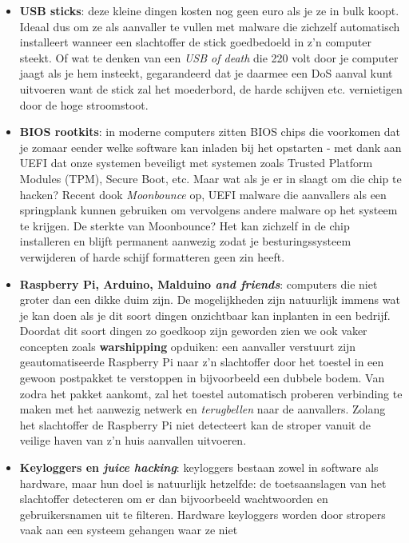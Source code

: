 \documentclass[
  10pt,
  dutch,
  paper=a4,
  ,captions=tableheading
]{scrbook}
\providecommand{\tightlist}{%
  \setlength{\itemsep}{0pt}\setlength{\parskip}{0pt}}
\begin{document}
\begin{itemize}
\tightlist
\item
  \textbf{USB sticks}: deze kleine dingen kosten nog geen euro als je ze
  in bulk koopt. Ideaal dus om ze als aanvaller te vullen met malware
  die zichzelf automatisch installeert wanneer een slachtoffer de stick
  goedbedoeld in z'n computer steekt. Of wat te denken van een \emph{USB
  of death} die 220 volt door je computer jaagt als je hem insteekt,
  gegarandeerd dat je daarmee een DoS aanval kunt uitvoeren want de
  stick zal het moederbord, de harde schijven etc. vernietigen door de
  hoge stroomstoot.
\item
  \textbf{BIOS rootkits}: in moderne computers zitten BIOS chips die
  voorkomen dat je zomaar eender welke software kan inladen bij het
  opstarten - met dank aan UEFI dat onze systemen beveiligt met systemen
  zoals Trusted Platform Modules (TPM), Secure Boot, etc. Maar wat als
  je er in slaagt om die chip te hacken? Recent dook \emph{Moonbounce}
  op, UEFI malware die aanvallers als een springplank kunnen gebruiken
  om vervolgens andere malware op het systeem te krijgen. De sterkte van
  Moonbounce? Het kan zichzelf in de chip installeren en blijft
  permanent aanwezig zodat je besturingssysteem verwijderen of harde
  schijf formatteren geen zin heeft.
\item
  \textbf{Raspberry Pi, Arduino, Malduino \emph{and friends}}: computers
  die niet groter dan een dikke duim zijn. De mogelijkheden zijn
  natuurlijk immens wat je kan doen als je dit soort dingen onzichtbaar
  kan inplanten in een bedrijf. Doordat dit soort dingen zo goedkoop
  zijn geworden zien we ook vaker concepten zoals \textbf{warshipping}
  opduiken: een aanvaller verstuurt zijn geautomatiseerde Raspberry Pi
  naar z'n slachtoffer door het toestel in een gewoon postpakket te
  verstoppen in bijvoorbeeld een dubbele bodem. Van zodra het pakket
  aankomt, zal het toestel automatisch proberen verbinding te maken met
  het aanwezig netwerk en \emph{terugbellen} naar de aanvallers. Zolang
  het slachtoffer de Raspberry Pi niet detecteert kan de stroper vanuit
  de veilige haven van z'n huis aanvallen uitvoeren.
\item
  \textbf{Keyloggers en \emph{juice hacking}}: keyloggers bestaan zowel
  in software als hardware, maar hun doel is natuurlijk hetzelfde: de
  toetsaanslagen van het slachtoffer detecteren om er dan bijvoorbeeld
  wachtwoorden en gebruikersnamen uit te filteren. Hardware keyloggers
  worden door stropers vaak aan een systeem gehangen waar ze niet

\end{itemize}
\end{document}
